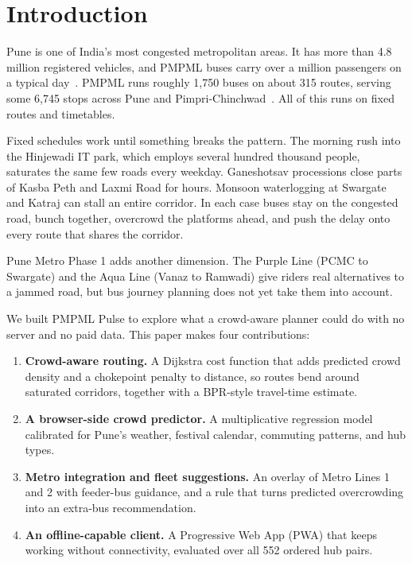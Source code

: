 \documentclass[conference]{IEEEtran}
\begin{document}
\section{Introduction}

Pune is one of India's most congested metropolitan areas. It has more than 4.8 million registered vehicles, and PMPML buses carry over a million passengers on a typical day~\cite{pmpml2024}. PMPML runs roughly 1,750 buses on about 315 routes, serving some 6,745 stops across Pune and Pimpri-Chinchwad~\cite{pmpml2024}. All of this runs on fixed routes and timetables.

Fixed schedules work until something breaks the pattern. The morning rush into the Hinjewadi IT park, which employs several hundred thousand people, saturates the same few roads every weekday. Ganeshotsav processions close parts of Kasba Peth and Laxmi Road for hours. Monsoon waterlogging at Swargate and Katraj can stall an entire corridor. In each case buses stay on the congested road, bunch together, overcrowd the platforms ahead, and push the delay onto every route that shares the corridor.

Pune Metro Phase 1 adds another dimension. The Purple Line (PCMC to Swargate) and the Aqua Line (Vanaz to Ramwadi) give riders real alternatives to a jammed road, but bus journey planning does not yet take them into account.

We built PMPML Pulse to explore what a crowd-aware planner could do with no server and no paid data. This paper makes four contributions:
\begin{enumerate}
  \item \textbf{Crowd-aware routing.} A Dijkstra cost function that adds predicted crowd density and a chokepoint penalty to distance, so routes bend around saturated corridors, together with a BPR-style travel-time estimate.
  \item \textbf{A browser-side crowd predictor.} A multiplicative regression model calibrated for Pune's weather, festival calendar, commuting patterns, and hub types.
  \item \textbf{Metro integration and fleet suggestions.} An overlay of Metro Lines 1 and 2 with feeder-bus guidance, and a rule that turns predicted overcrowding into an extra-bus recommendation.
  \item \textbf{An offline-capable client.} A Progressive Web App (PWA) that keeps working without connectivity, evaluated over all 552 ordered hub pairs.
\end{enumerate}
\end{document}

